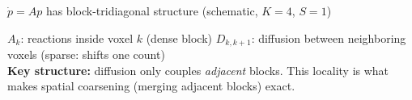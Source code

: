 \documentclass[10pt,aspectratio=169]{beamer}
\begin{document}
\begin{frame}{$\dot{p} = Ap$ has block-tridiagonal structure \textnormal{\small(schematic, $K{=}4$, $S{=}1$)}}
\begin{center}
\end{center}

\vspace{0.2em}
{\small
  \textcolor{myblue!80!black}{$A_k$}: reactions inside voxel $k$ (dense block)
  \hspace{1.5em}
  \textcolor{slowred!80!black}{$D_{k,k+1}$}: diffusion between neighboring voxels (sparse: shifts one count)\\[0.3em]
  \textbf{Key structure:} diffusion only couples \emph{adjacent} blocks.
  This locality is what makes spatial coarsening (merging adjacent blocks) exact.
}

\end{frame}
\end{document}

